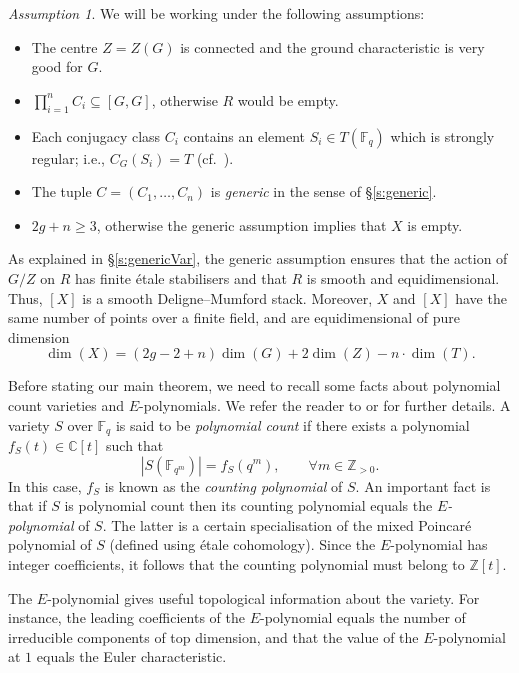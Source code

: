 \documentclass[12pt]{amsart}
\theoremstyle{plain}
\theoremstyle{definition}
\theoremstyle{remark}
\newtheorem{ass}[thm]{Assumption}
\newcommand{\bX}{{X}}
\newcommand{\bR}{R}
\newcommand{\Fq}{\mathbb{F}_q}
\begin{document}
\begin{ass} \label{a:mainAss}
We will be working under the following assumptions: 
\begin{itemize} 
\item The centre $Z=Z(G)$ is connected and the ground characteristic is very good for $G$. 
\item $\prod_{i=1}^n C_i\subseteq [G,G]$, otherwise $\bR$ would be empty. 
\item Each conjugacy class $C_i$ contains an element $S_i\in T(\Fq)$ which is strongly regular; i.e., $C_G(S_i)=T$ (cf.\ \cite{Steinberg65,Humphreys95}).  
\item The tuple $C=(C_1,\ldots ,C_n)$ is \emph{generic} in the sense of \S \ref{s:generic}.
\item $2g+n\geq 3$, otherwise the generic assumption implies that $X$ is empty. 
\end{itemize} 
\end{ass}


As explained in \S \ref{s:genericVar}, 
the generic assumption ensures that the action of $G/Z$ on $\bR$ has finite \'etale stabilisers and that $\bR$ is smooth and equidimensional. Thus, $[X]$ is a smooth Deligne--Mumford stack. Moreover, $X$ and $[X]$ have the same number of points over a finite field, and are equidimensional of pure dimension
\[
\dim(\bX)=(2g-2+n)\dim(G)+2\dim(Z)-n\cdot \dim(T).
\]


Before stating our main theorem, we need to recall some facts about polynomial count varieties and $E$-polynomials. We refer the reader to  \cite{HRV08} or \cite{LetellierVillegas} for further details. A variety $S$ over $\Fq$ is said to be \emph{polynomial count} if there exists a polynomial $f_S(t)\in \mathbb{C}[t]$ such that 
\[
|S(\mathbb{F}_{q^m})| = f_S(q^m),\qquad \forall m\in \mathbb{Z}_{>0}. 
\]
In this case, $f_S$ is known as the \emph{counting polynomial} of $S$. An important fact is that if $S$ is polynomial count then its counting polynomial equals the \emph{$E$-polynomial} of $S$. The latter is a certain specialisation of the mixed Poincar\'e polynomial of $S$ (defined using \'etale cohomology). Since the $E$-polynomial has integer coefficients, it follows that the counting polynomial must belong to $\mathbb{Z}[t]$. 

The $E$-polynomial gives useful topological information about the variety. For instance, the leading coefficients of the $E$-polynomial equals the number of irreducible components of top dimension, and that the value of the $E$-polynomial at $1$ equals the Euler characteristic. 
\end{document}
